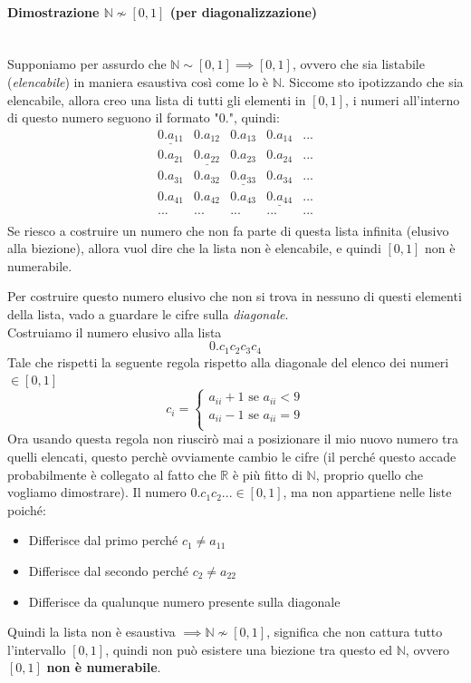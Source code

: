 \documentclass{article}
\begin{document}
\paragraph{Dimostrazione $\mathbb{N}\nsim[0,1]$ (per diagonalizzazione)}\mbox{}\\Supponiamo per assurdo che $\mathbb{N}\sim[0,1]\implies[0,1]$,
ovvero che sia listabile (\textit{elencabile}) in maniera esaustiva così come lo è $\mathbb{N}$.
Siccome sto ipotizzando che sia elencabile, allora creo una lista di tutti gli elementi in $[0,1]$, i numeri
all'interno di questo numero seguono il formato "$0.$", quindi:
\[
    \begin{array}{ccccc}
        \underline{0.a_{11}} & 0.a_{12}             & 0.a_{13}             & 0.a_{14}             & ... \\
        0.a_{21}             & \underline{0.a_{22}} & 0.a_{23}             & 0.a_{24}             & ... \\
        0.a_{31}             & 0.a_{32}             & \underline{0.a_{33}} & 0.a_{34}             & ... \\
        0.a_{41}             & 0.a_{42}             & 0.a_{43}             & \underline{0.a_{44}} & ... \\
        ...                  & ...                  & ...                  & ...                  & ... \\
    \end{array}
\]
Se riesco a costruire un numero che non fa parte di questa lista infinita (elusivo alla biezione),
allora vuol dire che la lista non è elencabile, e quindi $[0,1]$ non è numerabile.

Per costruire questo numero elusivo che non si trova in nessuno di questi elementi della lista,
vado a guardare le cifre sulla \textit{diagonale}.\\Costruiamo il numero elusivo alla lista
$$0.c_1c_2c_3c_4$$
Tale che rispetti la seguente regola rispetto alla diagonale del elenco dei numeri $\in [0,1]$
\[
    c_i=
    \begin{cases}
        a_{ii} + 1\text{ se }a_{ii} < 9 \\
        a_{ii} - 1\text{ se }a_{ii} = 9 \\
    \end{cases}
\]
Ora usando questa regola non riuscirò mai a posizionare il mio nuovo numero
tra quelli elencati, questo perchè ovviamente cambio le cifre (il perché questo accade
probabilmente è collegato al fatto che $\mathbb{R}$ è più fitto di $\mathbb{N}$, proprio
quello che vogliamo dimostrare).
Il numero $0.c_1c_2...\in[0,1]$, ma non appartiene nelle liste poiché:
\begin{itemize}
    \item Differisce dal primo perché $c_1\neq a_{11}$
    \item Differisce dal secondo perché $c_2\neq a_{22}$
    \item Differisce da qualunque numero presente sulla diagonale
\end{itemize}
Quindi la lista non è esaustiva $\implies \mathbb{N}\nsim[0,1]$, significa che non cattura tutto l'intervallo $[0,1]$,
quindi non può esistere una biezione tra questo ed $\mathbb{N}$, ovvero $[0,1]$ \textbf{non è numerabile}.
\end{document}

